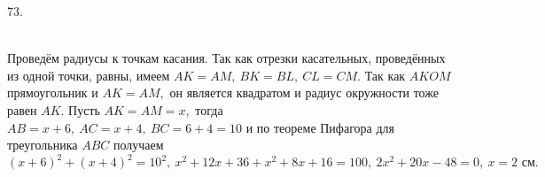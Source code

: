 73. \begin{figure}[ht!]
\end{figure}\\
Проведём радиусы к точкам касания. Так как отрезки касательных, проведённых из одной точки, равны, имеем $AK=AM,\ BK=BL,\ CL=CM.$ Так как $AKOM$ прямоугольник и $AK=AM,$ он является квадратом и радиус окружности тоже равен $AK.$ Пусть $AK=AM=x,$ тогда $AB=x+6,\ AC=x+4,\ BC=6+4=10$ и по теореме Пифагора для треугольника $ABC$ получаем $(x+6)^2+(x+4)^2=10^2,\ x^2+12x+36+x^2+8x+16=100,\ 2x^2+20x-48=0,\ x=2\text{ см}.$\\

